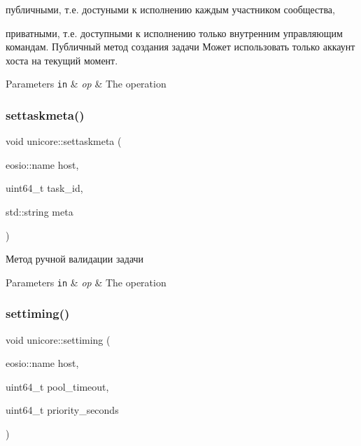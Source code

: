\begin{DoxyItemize}
\item публичными, т.\+е. достуными к исполнению каждым участником сообщества,
\item приватными, т.\+е. доступными к исполнению только внутренним управляющим командам. Публичный метод создания задачи Может использовать только аккаунт хоста на текущий момент.
\end{DoxyItemize}


\begin{DoxyParams}[1]{Parameters}
\mbox{\tt in}  & {\em op} & The operation \\
\hline
\end{DoxyParams}
\mbox{\label{classunicore_a07802302c610d2dc17f77a3019b81838}} 
\subsubsection{\texorpdfstring{settaskmeta()}{settaskmeta()}}
{\footnotesize\ttfamily void unicore\+::settaskmeta (\begin{DoxyParamCaption}\item[{eosio\+::name}]{host,  }\item[{uint64\+\_\+t}]{task\+\_\+id,  }\item[{std\+::string}]{meta }\end{DoxyParamCaption})}



Метод ручной валидации задачи 


\begin{DoxyParams}[1]{Parameters}
\mbox{\tt in}  & {\em op} & The operation \\
\hline
\end{DoxyParams}
\mbox{\label{classunicore_af4454491cb629dc007eed9b6febdd161}} 
\subsubsection{\texorpdfstring{settiming()}{settiming()}}
{\footnotesize\ttfamily void unicore\+::settiming (\begin{DoxyParamCaption}\item[{eosio\+::name}]{host,  }\item[{uint64\+\_\+t}]{pool\+\_\+timeout,  }\item[{uint64\+\_\+t}]{priority\+\_\+seconds }\end{DoxyParamCaption})}



